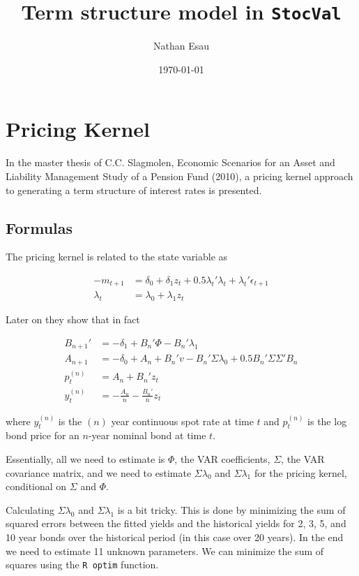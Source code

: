 \documentclass[12pt]{article}
\title{Term structure model in \texttt{StocVal}}
\author{Nathan Esau}
\date{\today}
\begin{document}


\maketitle

\section{Pricing Kernel}

In the master thesis of C.C. Slagmolen, Economic Scenarios for an Asset and Liability Management
Study of a Pension Fund (2010), a pricing kernel approach to generating a term structure of interest rates
is presented.

\subsection{Formulas}

\medskip
The pricing kernel is related to the state variable as 

\begin{align}
-m_{t+1} &= \delta_0 + \delta_1 z_t + 0.5 \lambda_t ' \lambda_t + \lambda_t' \epsilon_{t+1} \\
\lambda_t &= \lambda_0 + \lambda_1 z_t
\end{align}

Later on they show that in fact

\begin{align}
B_{n+1}' &= -\delta_1 + B_n' \Phi - B_{n}' \lambda_1 \\
A_{n+1} &= -\delta_0 + A_n + B_n'v - B_n'\Sigma\lambda_0 + 0.5 B_n'\Sigma\Sigma'B_n \\
p_{t}^{(n)} &= A_n + B_n' z_t \\
y_{t}^{(n)} &= -\frac{A_n}{n} - \frac{B_n'}{n} z_t 
\end{align}

where $y_{t}^{(n)}$ is the $(n)$ year continuous spot rate at time $t$ and $p_{t}^(n)$ 
is the log bond price for an $n$-year nominal bond at time $t$.

\medskip
Essentially, all we need to estimate is $\Phi$, the VAR coefficients, $\Sigma$, the VAR
covariance matrix, and we need to estimate $\Sigma \lambda_0$ and $\Sigma \lambda_1$ 
for the pricing kernel, conditional on $\Sigma$ and $\Phi$.

\medskip
Calculating $\Sigma \lambda_0$ and $\Sigma \lambda_1$ is a bit tricky. This is done
by minimizing the sum of squared errors between the fitted yields and the historical
yields for 2, 3, 5, and 10 year bonds over the historical period (in this case over 20 years).
In the end we need to estimate 11 unknown parameters. We can minimize the sum of squares
using the \texttt{R optim} function.
\end{document}
